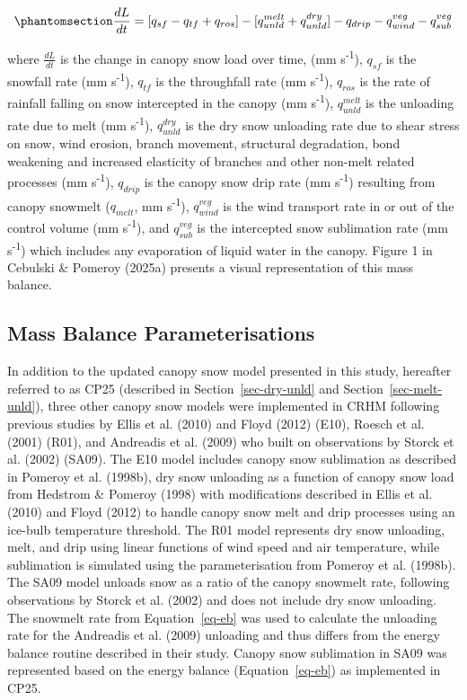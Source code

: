 \documentclass[
]{agujournal2019}
\begin{document}
\begin{equation}\phantomsection\label{eq-canopy-mass-bal}{
\frac{dL}{dt} = 
[q_{sf} - q_{tf} + q_{ros}] - [q_{unld}^{melt} + q_{unld}^{dry}] - q_{drip} - q_{wind}^{veg} - q_{sub}^{veg}
}\end{equation}

where \(\frac{dL}{dt}\) is the change in canopy snow load over time, (mm
s\textsuperscript{-1}), \(q_{sf}\) is the snowfall rate (mm
s\textsuperscript{-1}), \(q_{tf}\) is the throughfall rate (mm
s\textsuperscript{-1}), \(q_{ros}\) is the rate of rainfall falling on
snow intercepted in the canopy (mm s\textsuperscript{-1}),
\(q_{unld}^{melt}\) is the unloading rate due to melt (mm
s\textsuperscript{-1}), \(q_{unld}^{dry}\) is the dry snow unloading
rate due to shear stress on snow, wind erosion, branch movement,
structural degradation, bond weakening and increased elasticity of
branches and other non-melt related processes (mm
s\textsuperscript{-1}), \(q_{drip}\) is the canopy snow drip rate (mm
s\textsuperscript{-1}) resulting from canopy snowmelt (\(q_{melt}\), mm
s\textsuperscript{-1}), \(q_{wind}^{veg}\) is the wind transport rate in
or out of the control volume (mm s\textsuperscript{-1}), and
\(q_{sub}^{veg}\) is the intercepted snow sublimation rate (mm
s\textsuperscript{-1}) which includes any evaporation of liquid water in
the canopy. Figure 1 in Cebulski \& Pomeroy (2025a) presents a visual
representation of this mass balance.

\subsection{Mass Balance
Parameterisations}\label{mass-balance-parameterisations}

In addition to the updated canopy snow model presented in this study,
hereafter referred to as CP25 (described in Section~\ref{sec-dry-unld}
and Section~\ref{sec-melt-unld}), three other canopy snow models were
implemented in CRHM following previous studies by Ellis et al. (2010)
and Floyd (2012) (E10), Roesch et al. (2001) (R01), and Andreadis et al.
(2009) who built on observations by Storck et al. (2002) (SA09). The E10
model includes canopy snow sublimation as described in Pomeroy et al.
(1998b), dry snow unloading as a function of canopy snow load from
Hedstrom \& Pomeroy (1998) with modifications described in Ellis et al.
(2010) and Floyd (2012) to handle canopy snow melt and drip processes
using an ice-bulb temperature threshold. The R01 model represents dry
snow unloading, melt, and drip using linear functions of wind speed and
air temperature, while sublimation is simulated using the
parameterisation from Pomeroy et al. (1998b). The SA09 model unloads
snow as a ratio of the canopy snowmelt rate, following observations by
Storck et al. (2002) and does not include dry snow unloading. The
snowmelt rate from Equation~\ref{eq-eb} was used to calculate the
unloading rate for the Andreadis et al. (2009) unloading and thus
differs from the energy balance routine described in their study. Canopy
snow sublimation in SA09 was represented based on the energy balance
(Equation~\ref{eq-eb}) as implemented in CP25.
\end{document}
